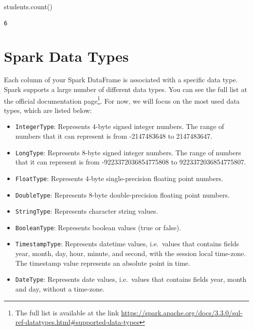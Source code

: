 \documentclass[
  11pt,
  letterpaper,
  DIV=11,
  numbers=noendperiod]{scrreprt}
\newenvironment{Shaded}{\begin{snugshade}}{\end{snugshade}}
\newcommand{\NormalTok}[1]{\textcolor[rgb]{0.00,0.23,0.31}{#1}}
\providecommand{\tightlist}{%
  \setlength{\itemsep}{0pt}\setlength{\parskip}{0pt}}\usepackage{longtable,booktabs,array}
\begin{document}
\begin{Shaded}
\begin{Highlighting}[]
\NormalTok{students.count()}
\end{Highlighting}
\end{Shaded}

\begin{verbatim}
6
\end{verbatim}

\hypertarget{spark-data-types}{%
\section{Spark Data Types}\label{spark-data-types}}

Each column of your Spark DataFrame is associated with a specific data
type. Spark supports a large number of different data types. You can see
the full list at the official documentation page\footnote{The full list
  is available at the link
  \url{https://spark.apache.org/docs/3.3.0/sql-ref-datatypes.html\#supported-data-types}}.
For now, we will focus on the most used data types, which are listed
below:

\begin{itemize}
\tightlist
\item
  \texttt{IntegerType}: Represents 4-byte signed integer numbers. The
  range of numbers that it can represent is from -2147483648 to
  2147483647.
\item
  \texttt{LongType}: Represents 8-byte signed integer numbers. The range
  of numbers that it can represent is from -9223372036854775808 to
  9223372036854775807.
\item
  \texttt{FloatType}: Represents 4-byte single-precision floating point
  numbers.
\item
  \texttt{DoubleType}: Represents 8-byte double-precision floating point
  numbers.
\item
  \texttt{StringType}: Represents character string values.
\item
  \texttt{BooleanType}: Represents boolean values (true or false).
\item
  \texttt{TimestampType}: Represents datetime values, i.e.~values that
  contains fields year, month, day, hour, minute, and second, with the
  session local time-zone. The timestamp value represents an absolute
  point in time.
\item
  \texttt{DateType}: Represents date values, i.e.~values that contains
  fields year, month and day, without a time-zone.
\end{itemize}
\end{document}
